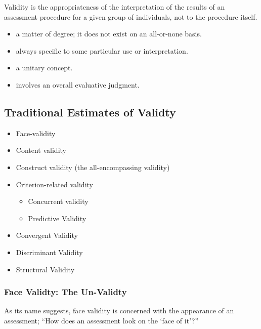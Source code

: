 \documentclass[
  english,
]{book}
\providecommand{\tightlist}{%
  \setlength{\itemsep}{0pt}\setlength{\parskip}{0pt}}
\begin{document}
Validity is the appropriateness of the interpretation of the results of an assessment procedure for a given group of individuals, not to the procedure itself.

\begin{itemize}
\tightlist
\item
  a matter of degree; it does not exist on an all-or-none basis.
\item
  always specific to some particular use or interpretation.
\item
  a unitary concept.
\item
  involves an overall evaluative judgment.
\end{itemize}

\hypertarget{traditional-estimates-of-validty}{%
\subsection{Traditional Estimates of Validty}\label{traditional-estimates-of-validty}}

\begin{itemize}
\tightlist
\item
  Face-validity
\item
  Content validity
\item
  Construct validity (the all-encompassing validity)
\item
  Criterion-related validity

  \begin{itemize}
  \tightlist
  \item
    Concurrent validity
  \item
    Predictive Validity
  \end{itemize}
\item
  Convergent Validity
\item
  Discriminant Validity
\item
  Structural Validity
\end{itemize}

\hypertarget{face-validty-the-un-validty}{%
\subsubsection{Face Validty: The Un-Validty}\label{face-validty-the-un-validty}}

As its name suggests, face validity is concerned with the appearance of an assessment; ``How does an assessment look on the `face of it'?''
\end{document}

